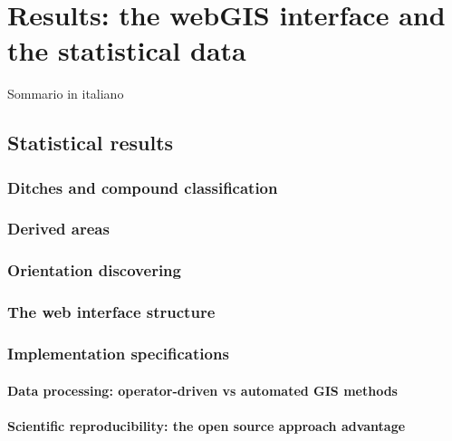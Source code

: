 \chapter{Results: the webGIS interface and the statistical data}

    \vspace{0.06\textheight}
    \begin{chaptersum}
        Sommario in italiano
    \end{chaptersum}

    \section{Statistical results}
        \subsection{Ditches and compound classification}
        \subsection{Derived areas}
        \subsection{Orientation discovering}
        \subsection{The web interface structure}
        \subsection{Implementation specifications}
            \subsubsection{Data processing: operator-driven vs automated GIS methods}
            \subsubsection{Scientific reproducibility: the open source approach advantage}

